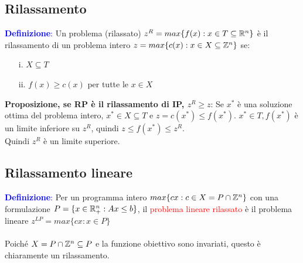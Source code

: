 \documentclass[12pt,a4paper]{article}
\begin{document}
\subsection{Rilassamento}
\textcolor{blue}{\textbf{Definizione}:} Un problema (rilassato) $z^R=max\{f(x):x\in T\subseteq \mathbb{R}^n\}$ è il rilassamento di un problema intero $z=max\{c(x):x\in X \subseteq \mathbb{Z}^n\}$ se: \begin{itemize}
\item[i.] $X\subseteq T$
\item[ii.] $f(x) \geq c(x)$ per tutte le $x \in X$
\end{itemize}
\textbf{Proposizione, se RP è il rilassamento di IP, $z^R \geq z$}: Se $x^*$ è una soluzione ottima del problema intero, $x^*\in X \subseteq T$ e $z=c(x^*) \leq f(x^*)$. $x^* \in T, f(x^*)$ è un limite inferiore su $z^R$, quindi $z\leq f(x^*) \leq z^R$.\\
Quindi $z^R$ è un limite superiore.

\subsection{Rilassamento lineare}
\textcolor{blue}{\textbf{Definizione}:} Per un programma intero $max\{cx:c\in X = P \cap \mathbb{Z}^n\}$ con una formulazione $P=\{x \in \mathbb{R}_+^n:Ax\leq b\}$, il \textcolor{red}{problema lineare rilassato} è il problema lineare $z^{LP}=max\{cx:x\in P\}$\\
\\
Poiché $X=P\cap\mathbb{Z}^n \subseteq P$ e la funzione obiettivo sono invariati, questo è chiaramente un rilassamento.
\end{document}
